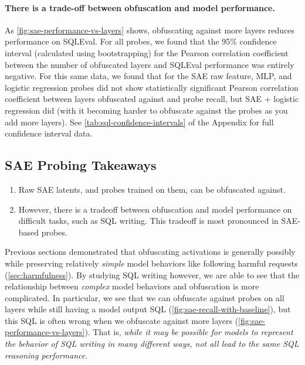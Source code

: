 \documentclass{article}
\begin{document}
\paragraph{There is a trade-off between obfuscation and model performance.}
As \cref{fig:sae-performance-vs-layers} shows, obfuscating against more
layers reduces performance on SQLEval. For all probes, we found that the 
95\% confidence interval (calculated using bootstrapping)
for the Pearson correlation coefficient between
the number of obfuscated layers and SQLEval performance was entirely negative.
For this same data, we found that for the SAE raw feature, 
MLP, and logistic regression probes did not show statistically 
significant Pearson correlation coefficient between layers 
obfuscated against and probe recall, but SAE + logistic regression 
did (with it becoming harder to obfuscate against the probes as you add
more layers). See \cref{tab:sql-confidence-intervals} of the 
Appendix for full confidence interval data.






\subsection{SAE Probing Takeaways}

\begin{takeawayBox}
    \begin{enumerate}
        \item Raw SAE latents, and probes trained on them, 
        can be obfuscated against.
        \item However, there is a tradeoff between obfuscation
        and model performance on difficult tasks, such as SQL writing. 
        This tradeoff is most pronounced in SAE-based probes.
    \end{enumerate}
\end{takeawayBox}
\vspace{1.5mm}


Previous sections demonstrated that obfuscating activations 
is generally possibly while preserving relatively \emph{simple} 
model behaviors like following harmful requests (\cref{sec:harmfulness}). By studying 
SQL writing however, we are able to see that the relationship
between \emph{complex} model behaviors and obfuscation 
is more complicated. In particular, we see that we
can obfuscate against probes on all layers while 
still having a model output SQL (\cref{fig:sae-recall-with-baseline}),
but this SQL is often wrong when we obfuscate against 
more layers (\cref{fig:sae-performance-vs-layers}).
That is, \emph{while it may be possible for models 
to represent the behavior of SQL writing in many 
different ways, not all lead to the same SQL reasoning performance.}
\end{document}
